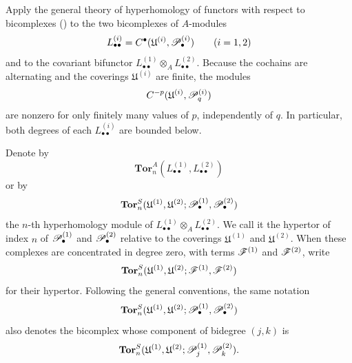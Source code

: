 \begin{env}[6.6.2]
\label{III.6.6.2}
Apply the general theory of hyperhomology of functors with
respect to bicomplexes () to the two
bicomplexes of $A$-modules
\[
  L_{\bullet\bullet}^{(i)}
  =
  C^\bullet(\mathfrak U^{(i)},\mathscr{P}_\bullet^{(i)})
  \qquad(i=1,2)
\]
and to the covariant bifunctor
$L_{\bullet\bullet}^{(1)}\otimes_A
 L_{\bullet\bullet}^{(2)}$.
Because the cochains are alternating and the coverings
$\mathfrak U^{(i)}$ are finite, the modules
\[
  C^{-p}(\mathfrak U^{(i)},\mathscr{P}_q^{(i)})
\]
are nonzero for only finitely many values of $p$, independently
of $q$.  In particular, both degrees of each
$L_{\bullet\bullet}^{(i)}$ are bounded below.

Denote by
\[
  \mathbf{Tor}_n^A
  (L_{\bullet\bullet}^{(1)},L_{\bullet\bullet}^{(2)})
\]
or by
\[
  \mathbf{Tor}_n^S
  (\mathfrak U^{(1)},\mathfrak U^{(2)};
   \mathscr{P}_\bullet^{(1)},\mathscr{P}_\bullet^{(2)})
\]
the $n$-th hyperhomology module of
$L_{\bullet\bullet}^{(1)}\otimes_A
 L_{\bullet\bullet}^{(2)}$.  We call it the hypertor of index
$n$ of $\mathscr{P}_\bullet^{(1)}$ and $\mathscr{P}_\bullet^{(2)}$ relative
to the coverings $\mathfrak U^{(1)}$ and
$\mathfrak U^{(2)}$.  When these complexes are concentrated in
degree zero, with terms $\mathscr{F}^{(1)}$ and $\mathscr{F}^{(2)}$, write
\[
  \mathbf{Tor}_n^S
  (\mathfrak U^{(1)},\mathfrak U^{(2)};
   \mathscr{F}^{(1)},\mathscr{F}^{(2)})
\]
for their hypertor.  Following the general conventions, the
same notation
\[
  \mathbf{Tor}_n^S
  (\mathfrak U^{(1)},\mathfrak U^{(2)};
   \mathscr{P}_\bullet^{(1)},\mathscr{P}_\bullet^{(2)})
\]
also denotes the bicomplex whose component of bidegree $(j,k)$
is
\[
  \mathbf{Tor}_n^S
  (\mathfrak U^{(1)},\mathfrak U^{(2)};
   \mathscr{P}_j^{(1)},\mathscr{P}_k^{(2)}).
\]


\end{env}
